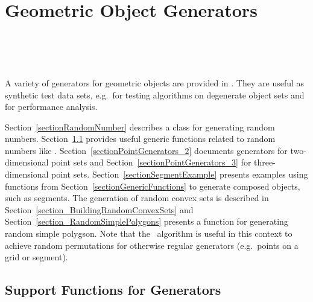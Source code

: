 
\ccParDims

\chapter{Geometric Object Generators}
\label{chapterGenerators}
\\
\\
\\

A variety of generators for geometric objects are provided in \cgal.
They are useful as synthetic test data sets, e.g.~for testing
algorithms on degenerate object sets and for performance analysis.

Section~\ref{sectionRandomNumber} describes a class for generating
random numbers.  Section~\ref{sectionGeneratorSupport} provides useful 
generic functions related to random
numbers like . Section~\ref{sectionPointGenerators_2}
documents generators for two-dimensional point sets and Section~\ref{sectionPointGenerators_3} for three-dimensional point sets. 
Section~\ref{sectionSegmentExample} presents examples
using functions from Section~\ref{sectionGenericFunctions} to generate
composed objects, such as segments.  The generation of random convex sets
is described in Section~\ref{section_BuildingRandomConvexSets} and
Section~\ref{section_RandomSimplePolygons} presents a function for 
generating random simple polygson.  Note that the \stl\ algorithm
 is useful in this context to achieve random
permutations for otherwise regular generators (e.g.~points on a grid
or segment).




\section{Support Functions for Generators}
\label{sectionGeneratorSupport}


